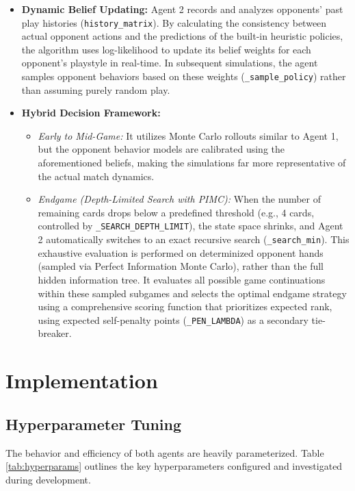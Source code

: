 \documentclass{article}
\begin{document}
\begin{itemize}
    \item \textbf{Dynamic Belief Updating:} Agent 2 records and analyzes opponents' past play histories (\texttt{history\_matrix}). By calculating the consistency between actual opponent actions and the predictions of the built-in heuristic policies, the algorithm uses log-likelihood to update its belief weights for each opponent's playstyle in real-time. In subsequent simulations, the agent samples opponent behaviors based on these weights (\texttt{\_sample\_policy}) rather than assuming purely random play.
    \item \textbf{Hybrid Decision Framework:}
    \begin{itemize}
        \item \textit{Early to Mid-Game:} It utilizes Monte Carlo rollouts similar to Agent 1, but the opponent behavior models are calibrated using the aforementioned beliefs, making the simulations far more representative of the actual match dynamics.
        \item \textit{Endgame (Depth-Limited Search with PIMC):} When the number of remaining cards drops below a predefined threshold (e.g., 4 cards, controlled by \texttt{\_SEARCH\_DEPTH\_LIMIT}), the state space shrinks, and Agent 2 automatically switches to an exact recursive search (\texttt{\_search\_min}). This exhaustive evaluation is performed on determinized opponent hands (sampled via Perfect Information Monte Carlo), rather than the full hidden information tree. It evaluates all possible game continuations within these sampled subgames and selects the optimal endgame strategy using a comprehensive scoring function that prioritizes expected rank, using expected self-penalty points (\texttt{\_PEN\_LAMBDA}) as a secondary tie-breaker.
    \end{itemize}
\end{itemize}

\section{Implementation}

\subsection{Hyperparameter Tuning}
The behavior and efficiency of both agents are heavily parameterized. Table \ref{tab:hyperparams} outlines the key hyperparameters configured and investigated during development.
\end{document}

